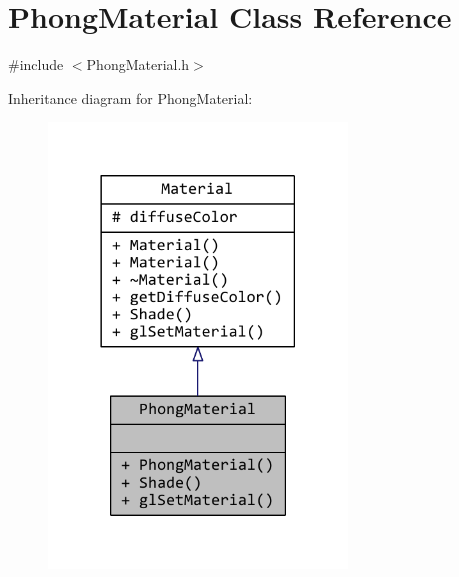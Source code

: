 \hypertarget{classPhongMaterial}{\section{Phong\+Material Class Reference}
\label{classPhongMaterial}
}


{\ttfamily \#include $<$Phong\+Material.\+h$>$}



Inheritance diagram for Phong\+Material\+:
\nopagebreak
\begin{figure}[H]
\begin{center}
\leavevmode
\includegraphics[width=225pt]{classPhongMaterial__inherit__graph}
\end{center}
\end{figure}


